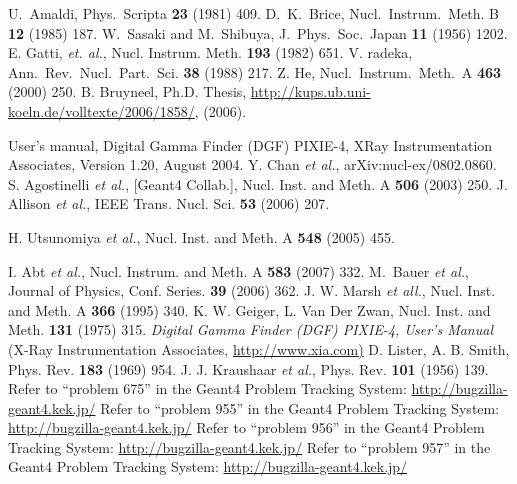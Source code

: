 \begin{thebibliography}{99}
 U.~Amaldi, Phys.~Scripta \textbf{23} (1981) 409.
 D.~K.~Brice, Nucl.~Instrum.~Meth. B \textbf{12} (1985) 187.
 W.~Sasaki and M.~Shibuya, J.~Phys.~Soc.~Japan \textbf{11} (1956) 1202.
 E. Gatti, \textit{et. al.}, Nucl. Instrum. Meth. \textbf{193} (1982) 651.
 V. radeka, Ann.~Rev.~Nucl.~Part.~Sci. \textbf{38}
  (1988) 217.
 Z. He, Nucl.~Instrum.~Meth.~A \textbf{463} (2000) 250.
 B. Bruyneel, Ph.D. Thesis, \url{http://kups.ub.uni-koeln.de/volltexte/2006/1858/}, (2006).

 User's manual, Digital Gamma Finder (DGF) PIXIE-4, XRay Instrumentation Associates, Version 1.20, August 2004.
 Y. Chan \textit{et al.}, arXiv:nucl-ex/0802.0860.
 S. Agostinelli \textit{et al.}, [Geant4 Collab.],  
Nucl.  Inst. and Meth. A \textbf{506} (2003) 250.
 J. Allison \textit{et al.}, IEEE Trans. Nucl. Sci.  
\textbf{53} (2006) 207.

 H. Utsunomiya \textit{et al.}, Nucl. Inst. and Meth. A \textbf{548} (2005) 455.

 I. Abt \textit{et al.}, Nucl. Instrum. and Meth. A   \textbf{583} (2007) 332.
 M.~Bauer \textit{et al.}, Journal of Physics, Conf.   Series. \textbf{39} (2006) 362.
 J. W. Marsh {\it et all.}, Nucl. Inst. and Meth. A   \textbf{366} (1995) 340.
 K. W. Geiger, L. Van Der Zwan, Nucl. Inst. and Meth.   \textbf{131} (1975) 315.
 \textit{Digital Gamma Finder (DGF) PIXIE-4, User's
    Manual} (X-Ray Instrumentation Associates, \url{http://www.xia.com)}
 D. Lister, A. B. Smith, Phys. Rev. \textbf{183} (1969)   954.
 J. J. Kraushaar \textit{et al.}, Phys. Rev.   \textbf{101} (1956) 139.
 Refer to ``problem 675'' in the Geant4 Problem
  Tracking System: \url{http://bugzilla-geant4.kek.jp/}
 Refer to ``problem 955'' in the Geant4 Problem
  Tracking System: \url{http://bugzilla-geant4.kek.jp/}
 Refer to ``problem 956'' in the Geant4 Problem
  Tracking System: \url{http://bugzilla-geant4.kek.jp/}
 Refer to ``problem 957'' in the Geant4 Problem
  Tracking System: \url{http://bugzilla-geant4.kek.jp/}


\end{thebibliography}
